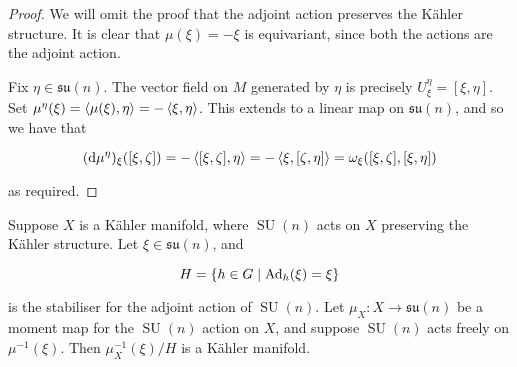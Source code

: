 \documentclass{article}
\DeclareMathOperator{\SU}{SU}
\newcommand{\su}{\mathfrak{su}}
\begin{document}
\begin{proof}
    We will omit the proof that the adjoint action preserves the K\"ahler structure. It is clear that \(\mu(\xi) = -\xi\) is equivariant, since both the actions are the adjoint action. 
    
    Fix \(\eta \in \su(n)\). The vector field on \(M\) generated by \(\eta\) is precisely \(U^\eta_\xi = [\xi, \eta]\). Set \(\mu^\eta(\xi) = \left\langle \mu(\xi), \eta \right\rangle = -\left\langle \xi, \eta \right\rangle\). This extends to a linear map on \(\su(n)\), and so we have that

    \[(\dd\mu^\eta)_\xi([\xi, \zeta]) = -\left\langle [\xi, \zeta], \eta \right\rangle = -\left\langle \xi, [\zeta, \eta] \right\rangle = \omega_{\xi}([\xi, \zeta], [\xi, \eta])\]

    as required.
\end{proof}

\begin{theorem}
     Suppose \(X\) is a K\"ahler manifold, where \(\SU(n)\) acts on \(X\) preserving the K\"ahler structure. Let \(\xi \in \su(n)\), and

    \[H = \left\{h \in G \mid \operatorname{Ad}_h(\xi) = \xi\right\}\]

    is the stabiliser for the adjoint action of \(\SU(n)\). Let \(\mu_X : X \to \su(n)\) be a moment map for the \(\SU(n)\) action on \(X\), and suppose \(\SU(n)\) acts freely on \(\mu^{-1}(\xi)\). Then \(\mu_X^{-1}(\xi)/H\) is a K\"ahler manifold.
\end{theorem}
\end{document}
